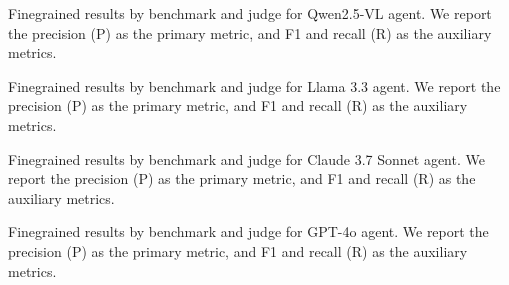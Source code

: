 \documentclass{article} %
\begin{document}
\begin{table}[t]
    \centering
    \scriptsize
    
    \caption{\small Finegrained results by benchmark and judge for Qwen2.5-VL agent. We report the precision (P) as the primary metric, and F1 and recall (R) as the auxiliary metrics.}
    \label{tab:appendix_finegrained_results_qwen}
\end{table}


\begin{table}[t]
    \centering
    \scriptsize
    
    \caption{\small Finegrained results by benchmark and judge for Llama 3.3 agent. We report the precision (P) as the primary metric, and F1 and recall (R) as the auxiliary metrics.}
    \label{tab:appendix_finegrained_results_llama}
\end{table}

\begin{table}[t]
    \centering
    \scriptsize
    
    \caption{\small Finegrained results by benchmark and judge for Claude 3.7 Sonnet agent. We report the precision (P) as the primary metric, and F1 and recall (R) as the auxiliary metrics.}
    \label{tab:appendix_finegrained_results_claude}
\end{table}

\begin{table}[t]
    \centering
    \scriptsize
    
    \caption{\small Finegrained results by benchmark and judge for GPT-4o agent. We report the precision (P) as the primary metric, and F1 and recall (R) as the auxiliary metrics.}
    \label{tab:appendix_finegrained_results_gpt}
\end{table}
\end{document}

